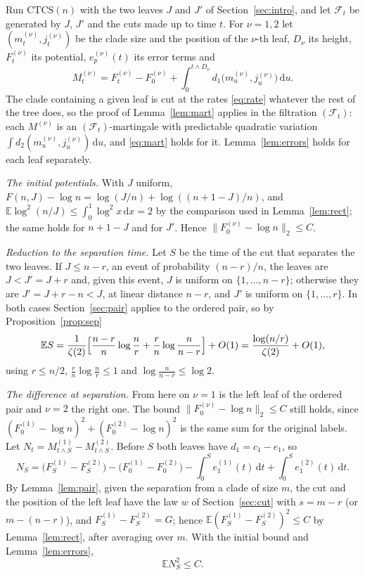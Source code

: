 \documentclass[11pt]{amsart}
\theoremstyle{remark}
\numberwithin{equation}{section}
\newcommand{\E}{\mathbb E}
\newcommand{\dd}{\,\mathrm d}
\begin{document}
Run $\mathrm{CTCS}(n)$ with the two leaves $J$ and $J'$ of Section~\ref{sec:intro}, and let $\mathcal F_t$ be generated by $J$, $J'$ and the cuts made up to time $t$. For $\nu=1,2$ let $(m^{(\nu)}_t,j^{(\nu)}_t)$ be the clade size and the position of the $\nu$-th leaf, $D_\nu$ its height, $F^{(\nu)}_t$ its potential, $e^{(\nu)}_p(t)$ its error terms and
\[
M^{(\nu)}_t=F^{(\nu)}_t-F^{(\nu)}_0+\int_0^{t\wedge D_\nu}d_1\bigl(m^{(\nu)}_u,j^{(\nu)}_u\bigr)\dd u .
\]
The clade containing a given leaf is cut at the rates \eqref{eq:rate} whatever the rest of the tree does, so the proof of Lemma~\ref{lem:mart} applies in the filtration $(\mathcal F_t)$: each $M^{(\nu)}$ is an $(\mathcal F_t)$-martingale with predictable quadratic variation $\int d_2(m^{(\nu)}_u,j^{(\nu)}_u)\dd u$, and \eqref{eq:mart} holds for it. Lemma~\ref{lem:errors} holds for each leaf separately.

\emph{The initial potentials.} With $J$ uniform, $F(n,J)-\log n=\log(J/n)+\log((n+1-J)/n)$, and $\E\log^2(n/J)\le\int_0^1\log^2x\dd x=2$ by the comparison used in Lemma~\ref{lem:rect}; the same holds for $n+1-J$ and for $J'$. Hence $\|F^{(\nu)}_0-\log n\|_2\le C$.

\emph{Reduction to the separation time.} Let $S$ be the time of the cut that separates the two leaves. If $J\le n-r$, an event of probability $(n-r)/n$, the leaves are $J<J'=J+r$ and, given this event, $J$ is uniform on $\{1,\dots,n-r\}$; otherwise they are $J'=J+r-n<J$, at linear distance $n-r$, and $J'$ is uniform on $\{1,\dots,r\}$. In both cases Section~\ref{sec:pair} applies to the ordered pair, so by Proposition~\ref{prop:sep}
\begin{equation}\label{eq:ES}
\E S=\frac1{\zeta(2)}\Bigl[\frac{n-r}n\log\frac nr+\frac rn\log\frac n{n-r}\Bigr]+O(1)=\frac{\log(n/r)}{\zeta(2)}+O(1),
\end{equation}
using $r\le n/2$, $\frac rn\log\frac nr\le1$ and $\log\frac n{n-r}\le\log2$.

\emph{The difference at separation.} From here on $\nu=1$ is the left leaf of the ordered pair and $\nu=2$ the right one. The bound $\|F^{(\nu)}_0-\log n\|_2\le C$ still holds, since $(F^{(1)}_0-\log n)^2+(F^{(2)}_0-\log n)^2$ is the same sum for the original labels. Let $N_t=M^{(1)}_{t\wedge S}-M^{(2)}_{t\wedge S}$. Before $S$ both leaves have $d_1=c_1-e_1$, so
\[
N_S=\bigl(F^{(1)}_S-F^{(2)}_S\bigr)-\bigl(F^{(1)}_0-F^{(2)}_0\bigr)-\int_0^Se^{(1)}_1(t)\dd t+\int_0^Se^{(2)}_1(t)\dd t .
\]
By Lemma~\ref{lem:pair}, given the separation from a clade of size $m$, the cut and the position of the left leaf have the law $w$ of Section~\ref{sec:cut} with $s=m-r$ (or $m-(n-r)$), and $F^{(1)}_S-F^{(2)}_S=G$; hence $\E(F^{(1)}_S-F^{(2)}_S)^2\le C$ by Lemma~\ref{lem:rect}, after averaging over $m$. With the initial bound and Lemma~\ref{lem:errors},
\begin{equation}\label{eq:NS}
\E N_S^2\le C .
\end{equation}
\end{document}
